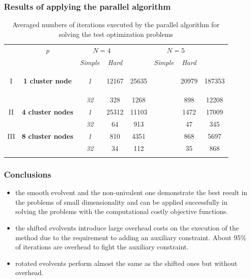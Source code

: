 \documentclass[aspectratio=1610]{beamer}
\begin{document}
\begin{frame}
  \frametitle{Results of applying the parallel algorithm}

  \begin{table}
    \centering
    \caption{Averaged numbers of iterations executed by the parallel algorithm for solving the test
  optimization problems}
    \label{tab:iterations}
    \begin{tabular}{cccccccc}
      \cline{3-8}\noalign{\smallskip}
      \multicolumn{2}{c}{  } & \textit{p} & \multicolumn{2}{c}{$N=4$} & &
  \multicolumn{2}{c}{$N=5$}   \\
      \noalign{\smallskip} \cline{4-5} \cline{7-8}  \noalign{\smallskip}
      \multicolumn{2}{c}{  } & & \textit{Simple} & \textit{Hard} & & \textit{Simple} &
  \textit{Hard}  \\
      \noalign{\smallskip}\hline
      I &
      \parbox{0.25\textwidth}{
      \begin{center}
      \textbf{1 cluster node}
      \end{center}		}
        & \textit{1} & 12167 & 25635 & & 20979 & 187353  \\
      &  & \textit{32} & 328 & 1268  & &   898 & 12208 \\
      \hline \noalign{\smallskip}
  II  & \textbf{4 cluster nodes}  %
    & \textit{1} & 25312 & 11103 & & 1472 & 17009 \\
  &   & \textit{32} & 64 &   913 & & 47 & 345 \\
      \noalign{\smallskip}\hline	\noalign{\smallskip}
  III & \textbf{8 cluster nodes} %
    & \textit{1}  & 810 & 4351 & & 868 & 5697  \\
  & & \textit{32} & 34  & 112  & & 35  & 868 \\
      \noalign{\smallskip}\hline
    \end{tabular}
  \end{table}

\end{frame}

\begin{frame}
  \frametitle{Conclusions}
    \begin{itemize}
      \item the smooth evolvent and the non-univalent one demonstrate the best result in the problems of small dimensionality and can be applied successfully in solving the problems with the computational costly objective functions.
      \item the shifted evolvents introduce large overhead costs on the execution of the method due to the requirement to adding an auxiliary constraint. About 95\% of iterations are overhead to fight the auxiliary constraint.
      \item rotated evolvents perform almost the same as the shifted ones but without overhead.
    \end{itemize}
\end{frame}
\end{document}
